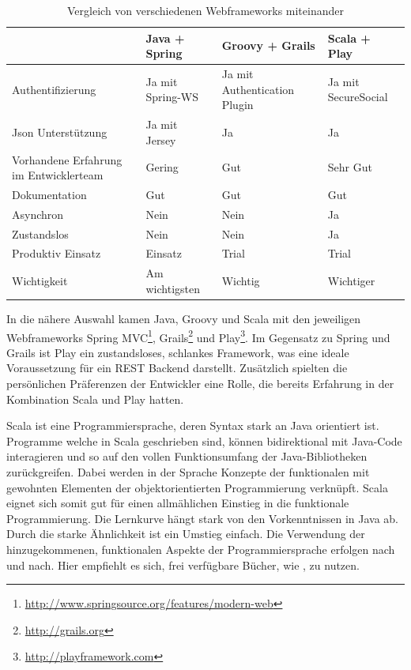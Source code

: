 \begin{table}
  \begin{tabularx}{\textwidth}{|X|l|l|l|}
    \hline
    ~                                      & Java + Spring    & Groovy + Grails              & Scala + Play        \\\hline
    Authentifizierung                      & Ja mit Spring-WS & Ja mit Authentication Plugin & Ja mit SecureSocial \\\hline
    Json Unterstützung                     & Ja mit Jersey    & Ja                           & Ja                  \\\hline
    Vorhandene Erfahrung im Entwicklerteam & Gering           & Gut                          & Sehr Gut            \\\hline
    Dokumentation                          & Gut              & Gut                          & Gut                 \\\hline
    Asynchron                              & Nein             & Nein                         & Ja                  \\\hline
    Zustandslos                            & Nein             & Nein                         & Ja                  \\\hline
    Produktiv Einsatz                      & Einsatz          & Trial                        & Trial               \\\hline
    Wichtigkeit                            & Am wichtigsten   & Wichtig                      & Wichtiger           \\\hline
  \end{tabularx}
  \caption {Vergleich von verschiedenen Webframeworks miteinander}
  \label{tab:FrameWorkVergleich}
\end{table}

In die nähere Auswahl kamen Java, Groovy und Scala mit den jeweiligen Webframeworks Spring MVC\footnote{\url{http://www.springsource.org/features/modern-web}}, Grails\footnote{\url{http://grails.org}} und Play\footnote{\url{http://playframework.com}}. Im Gegensatz zu Spring und Grails ist Play ein zustandsloses, schlankes Framework, was eine ideale Voraussetzung für ein REST Backend darstellt. Zusätzlich spielten die persönlichen Präferenzen der Entwickler eine Rolle, die bereits Erfahrung in der Kombination Scala und Play hatten.

Scala ist eine Programmiersprache, deren Syntax stark an Java orientiert ist. Programme welche in Scala geschrieben sind, können bidirektional mit Java-Code interagieren und so auf den vollen Funktionsumfang der Java-Bibliotheken zurückgreifen. Dabei werden in der Sprache Konzepte der funktionalen mit gewohnten Elementen der objektorientierten Programmierung verknüpft. Scala eignet sich somit gut für einen allmählichen Einstieg in die funktionale Programmierung. Die Lernkurve hängt stark von den Vorkenntnissen in Java ab. Durch die starke Ähnlichkeit ist ein Umstieg einfach. Die Verwendung der hinzugekommenen, funktionalen Aspekte der Programmiersprache erfolgen nach und nach. Hier empfiehlt es sich, frei verfügbare Bücher, wie \cite{scala-by-example}, zu nutzen.

